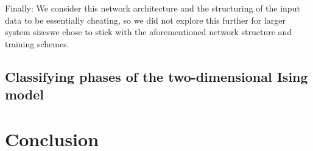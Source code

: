\documentclass[a4paper, twocolumn]{article}
\begin{document}
Finally: We consider this network architecture and the structuring of the input data to be essentially cheating, so we did not explore this further for larger system sizes\textemdash we chose to stick with the aforementioned network structure and training schemes.

\subsection{Classifying phases of the two-dimensional Ising model}
\lipsum[10]
\section{Conclusion}
\lipsum[11]

\onecolumn{
\printbibliography
}
\end{document}
